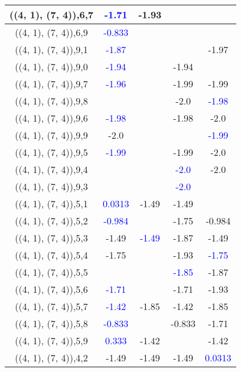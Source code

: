 \documentclass{article}
\begin{document}
\begin{center}
\begin{longtable}{|c|c|c|c|c|}
        	\hline
        	((4, 1), (7, 4)),6,7& \textcolor{blue}{-1.71}&-1.93&&\\
        	\hline
        	((4, 1), (7, 4)),6,9& \textcolor{blue}{-0.833}&&&\\
        	\hline
        	((4, 1), (7, 4)),9,1& \textcolor{blue}{-1.87}&&&-1.97\\
        	\hline
        	((4, 1), (7, 4)),9,0& \textcolor{blue}{-1.94}&&-1.94&\\
        	\hline
        	((4, 1), (7, 4)),9,7& \textcolor{blue}{-1.96}&&-1.99&-1.99\\
        	\hline
        	((4, 1), (7, 4)),9,8&&&-2.0& \textcolor{blue}{-1.98}\\
        	\hline
        	((4, 1), (7, 4)),9,6& \textcolor{blue}{-1.98}&&-1.98&-2.0\\
        	\hline
        	((4, 1), (7, 4)),9,9&-2.0&&& \textcolor{blue}{-1.99}\\
        	\hline
        	((4, 1), (7, 4)),9,5& \textcolor{blue}{-1.99}&&-1.99&-2.0\\
        	\hline
        	((4, 1), (7, 4)),9,4&&& \textcolor{blue}{-2.0}&-2.0\\
        	\hline
        	((4, 1), (7, 4)),9,3&&& \textcolor{blue}{-2.0}&\\
        	\hline
        	((4, 1), (7, 4)),5,1& \textcolor{blue}{0.0313}&-1.49&-1.49&\\
        	\hline
        	((4, 1), (7, 4)),5,2& \textcolor{blue}{-0.984}&&-1.75&-0.984\\
        	\hline
        	((4, 1), (7, 4)),5,3&-1.49& \textcolor{blue}{-1.49}&-1.87&-1.49\\
        	\hline
        	((4, 1), (7, 4)),5,4&-1.75&&-1.93& \textcolor{blue}{-1.75}\\
        	\hline
        	((4, 1), (7, 4)),5,5&&& \textcolor{blue}{-1.85}&-1.87\\
        	\hline
        	((4, 1), (7, 4)),5,6& \textcolor{blue}{-1.71}&&-1.71&-1.93\\
        	\hline
        	((4, 1), (7, 4)),5,7& \textcolor{blue}{-1.42}&-1.85&-1.42&-1.85\\
        	\hline
        	((4, 1), (7, 4)),5,8& \textcolor{blue}{-0.833}&&-0.833&-1.71\\
        	\hline
        	((4, 1), (7, 4)),5,9& \textcolor{blue}{0.333}&-1.42&&-1.42\\
        	\hline
        	((4, 1), (7, 4)),4,2&-1.49&-1.49&-1.49& \textcolor{blue}{0.0313}\\

\end{longtable}
\end{center}
\end{document}
